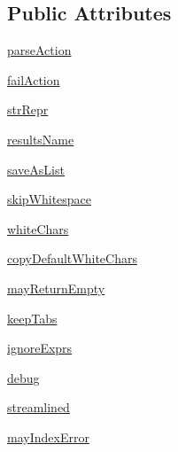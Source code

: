 \subsection*{Public Attributes}
\begin{DoxyCompactItemize}
\item 
\hyperlink{classpkg__resources_1_1__vendor_1_1pyparsing_1_1ParserElement_a54a22dc348fd329483891cfd572a6274}{parse\+Action}
\item 
\hyperlink{classpkg__resources_1_1__vendor_1_1pyparsing_1_1ParserElement_a41a0622941a0a4bee893ceaca376a5dd}{fail\+Action}
\item 
\hyperlink{classpkg__resources_1_1__vendor_1_1pyparsing_1_1ParserElement_a17f122ea842899f781a028b4ab9d2876}{str\+Repr}
\item 
\hyperlink{classpkg__resources_1_1__vendor_1_1pyparsing_1_1ParserElement_a8ec9708a54a668a04f24fe5e89981c49}{results\+Name}
\item 
\hyperlink{classpkg__resources_1_1__vendor_1_1pyparsing_1_1ParserElement_aa618a8823853247b5105cf8e34d7ea0a}{save\+As\+List}
\item 
\hyperlink{classpkg__resources_1_1__vendor_1_1pyparsing_1_1ParserElement_a97cf12c535745562c78a76b3bdb7490e}{skip\+Whitespace}
\item 
\hyperlink{classpkg__resources_1_1__vendor_1_1pyparsing_1_1ParserElement_a3cbfa32c6c29ef9d21503c66a5f1809b}{white\+Chars}
\item 
\hyperlink{classpkg__resources_1_1__vendor_1_1pyparsing_1_1ParserElement_a19b8db45a7e79e93ab70a36bc1e0d42d}{copy\+Default\+White\+Chars}
\item 
\hyperlink{classpkg__resources_1_1__vendor_1_1pyparsing_1_1ParserElement_a83f7f747caed9d2865a983668d809137}{may\+Return\+Empty}
\item 
\hyperlink{classpkg__resources_1_1__vendor_1_1pyparsing_1_1ParserElement_ae93d8183eecae74400ed240710586937}{keep\+Tabs}
\item 
\hyperlink{classpkg__resources_1_1__vendor_1_1pyparsing_1_1ParserElement_a248ee3f04277d34fe633a5a0d699252b}{ignore\+Exprs}
\item 
\hyperlink{classpkg__resources_1_1__vendor_1_1pyparsing_1_1ParserElement_a5bd655b9444a03c9a9ecc6986378545a}{debug}
\item 
\hyperlink{classpkg__resources_1_1__vendor_1_1pyparsing_1_1ParserElement_adc254898cf025bcb89d0c2fd018acccc}{streamlined}
\item 
\hyperlink{classpkg__resources_1_1__vendor_1_1pyparsing_1_1ParserElement_a1f50e407b9d59891556185b40fcb394a}{may\+Index\+Error}

\end{DoxyCompactItemize}
